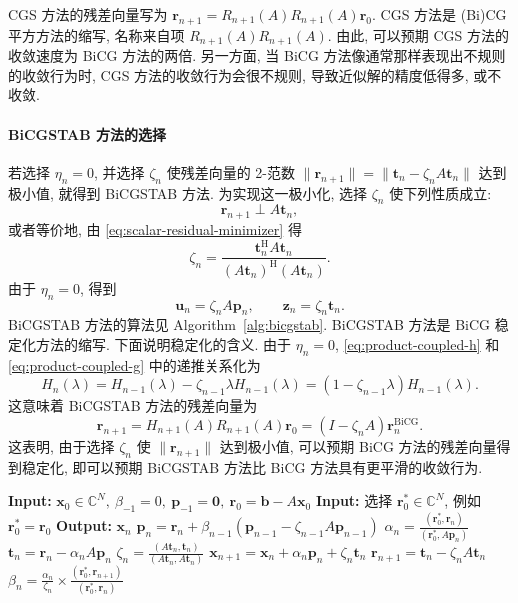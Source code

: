 {CGS 方法的残差向量写为 $\bm r_{n+1}=R_{n+1}(A)R_{n+1}(A)\bm r_0$. CGS 方法是 (Bi)CG 平方方法的缩写, 名称来自项 $R_{n+1}(A)R_{n+1}(A)$. 由此, 可以预期 CGS 方法的收敛速度为 BiCG 方法的两倍. 另一方面, 当 BiCG 方法像通常那样表现出不规则的收敛行为时, CGS 方法的收敛行为会很不规则, 导致近似解的精度低得多, 或不收敛.}
\paragraph{{BiCGSTAB 方法的选择}}\label{subsec:bicgstab-parameter-choice}\mbox{}\par
{若选择 $\eta_n=0$, 并选择 $\zeta_n$ 使残差向量的 2-范数 $\|\bm r_{n+1}\|=\|\bm t_n-\zeta_nA\bm t_n\|$ 达到极小值, 就得到 BiCGSTAB 方法. 为实现这一极小化, 选择 $\zeta_n$ 使下列性质成立:}
\[\bm r_{n+1}\perp A\bm t_n,\]
{或者等价地, 由 \eqref{eq:scalar-residual-minimizer} 得}
\[\zeta_n=\frac{\bm t_n^{\mathrm H}A\bm t_n}{(A\bm t_n)^{\mathrm H}(A\bm t_n)}.\]
{由于 $\eta_n=0$, 得到}
\[\bm u_n=\zeta_nA\bm p_n,\qquad\bm z_n=\zeta_n\bm t_n.\]
{BiCGSTAB 方法的算法见 Algorithm\ \ref{alg:bicgstab}.}
{BiCGSTAB 方法是 BiCG 稳定化方法的缩写. 下面说明稳定化的含义. 由于 $\eta_n=0$, \eqref{eq:product-coupled-h} 和 \eqref{eq:product-coupled-g} 中的递推关系化为}
\[H_n(\lambda)=H_{n-1}(\lambda)-\zeta_{n-1}\lambda H_{n-1}(\lambda)=(1-\zeta_{n-1}\lambda)H_{n-1}(\lambda).\]
{这意味着 BiCGSTAB 方法的残差向量为}
\[\bm r_{n+1}=H_{n+1}(A)R_{n+1}(A)\bm r_0=(I-\zeta_nA)\bm r_n^{\mathrm{BiCG}}.\]
{这表明, 由于选择 $\zeta_n$ 使 $\|\bm r_{n+1}\|$ 达到极小值, 可以预期 BiCG 方法的残差向量得到稳定化, 即可以预期 BiCGSTAB 方法比 BiCG 方法具有更平滑的收敛行为.}
\begin{algorithm}[H]\caption{{BiCGSTAB 方法}}\label{alg:bicgstab}\begin{algorithmic}[1]
\Statex\textbf{Input:} $\bm x_0\in\mathbb C^N,\ \beta_{-1}=0,\ \bm p_{-1}=\bm0,\ \bm r_0=\bm b-A\bm x_0$
\Statex\textbf{Input:} {选择 $\bm r_0^{*}\in\mathbb C^N$, 例如 $\bm r_0^{*}=\bm r_0$}
\Statex\textbf{Output:} $\bm x_n$
\State $\bm p_n=\bm r_n+\beta_{n-1}(\bm p_{n-1}-\zeta_{n-1}A\bm p_{n-1})$
\State $\alpha_n=\frac{(\bm r_0^{*},\bm r_n)}{(\bm r_0^{*},A\bm p_n)}$
\State $\bm t_n=\bm r_n-\alpha_nA\bm p_n$
\State $\zeta_n=\frac{(A\bm t_n,\bm t_n)}{(A\bm t_n,A\bm t_n)}$
\State $\bm x_{n+1}=\bm x_n+\alpha_n\bm p_n+\zeta_n\bm t_n$
\State $\bm r_{n+1}=\bm t_n-\zeta_nA\bm t_n$
\State $\beta_n=\frac{\alpha_n}{\zeta_n}\times\frac{(\bm r_0^{*},\bm r_{n+1})}{(\bm r_0^{*},\bm r_n)}$
\EndFor\end{algorithmic}\end{algorithm}
